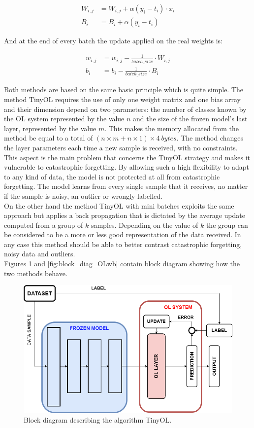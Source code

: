 \documentclass[12pt]{report}
\begin{document}
\begin{align}
	W_{i,j} &= W_{i,j} + \alpha (y_i - t_i) \cdot x_i \\
    B_i     &= B_i + \alpha  (y_i - t_i) 
\end{align}

And at the end of every batch the update applied on the real weights is:

\begin{align}
	w_{i,j} &= w_{i,j} - \frac{1}{batch\_size} \cdot W_{i,j} \\
	b_i     &= b_i - \frac{1}{batch\_size} \cdot B_i
\end{align}

Both methods are based on the same basic principle which is quite simple. The method TinyOL requires the use of only one weight matrix and one bias array and their dimension depend on two parameters: the number of classes known by the OL system represented by the value $n$ and the size of the frozen model's last layer, represented by the value $m$. This makes the memory allocated from the method be equal to a total of $(n \times m+n \times 1)\times 4 \: bytes$. The method changes the layer parameters each time a new sample is received, with no constraints. This aspect is the main problem that concerns the TinyOL strategy and makes it vulnerable to catastrophic forgetting. By allowing such a high flexibility to adapt to any kind of data, the model is not protected at all from catastrophic forgetting. The model learns from every single sample that it receives, no matter if the sample is noisy, an outlier or wrongly labelled.\\
On the other hand the method TinyOL with mini batches exploits the same approach but applies a back propagation that is dictated by the average update computed from a group of $k$ samples. Depending on the value of $k$ the group can be considered to be a more or less good representation of the data received. In any case this method should be able to better contrast catastrophic forgetting, noisy data and outliers. \\
Figures \ref{fig:block_diag_OL} and \ref{fig:block_diag_OLwb} contain block diagram showing how the two methods behave.

\begin{figure}[h!]
    \centering
    \includegraphics[width=120mm]{Figures/Chapter3/OL_.png} 
    \caption{Block diagram describing the algorithm TinyOL.}
    \label{fig:block_diag_OL}    
\end{figure}
\end{document}

